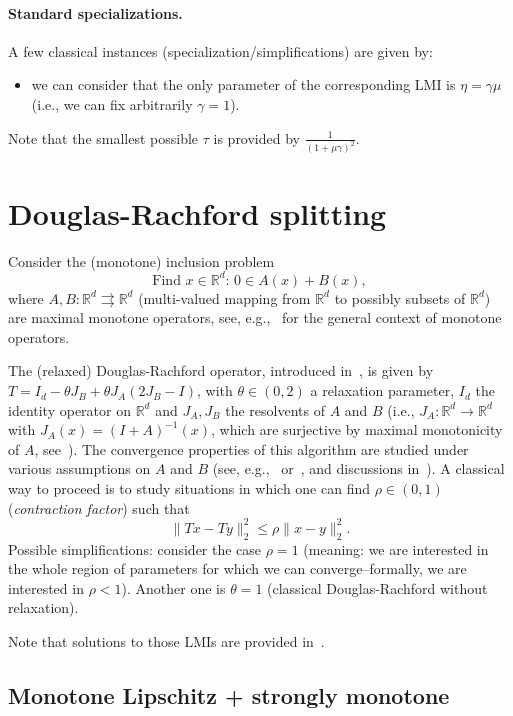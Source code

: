 \documentclass[nonacm]{acmart}
\renewcommand{\leq}{\leqslant}
\begin{document}
\paragraph{Standard specializations.} A few classical instances (specialization/simplifications) are given by:
\begin{itemize}
	\item we can consider that the only parameter of the corresponding LMI is $\eta=\gamma\mu$ (i.e., we can fix arbitrarily $\gamma=1$).
\end{itemize}
Note that the smallest possible $\tau$ is provided by $\frac{1}{(1+\mu\gamma)^2}$.
\section{Douglas-Rachford splitting}

Consider the (monotone) inclusion problem  
\[ \text{Find } {x\in\mathbb{R}^d}:\, 0\in A(x)+B(x),\]
where $A,B:\mathbb{R}^d\rightrightarrows \mathbb{R}^d$ (multi-valued mapping from $\mathbb{R}^d$ to possibly subsets of $\mathbb{R}^d$) are maximal monotone operators, see, e.g.,~\cite{bauschke2017} for the general context of monotone operators.




The (relaxed) Douglas-Rachford operator, introduced in~\cite{douglas1956numerical}, is given by $T=I_d-\theta J_B+\theta J_A(2J_B-I)$, with $\theta\in (0,2)$ a relaxation parameter, $I_d$ the identity operator on $\mathbb{R}^d$ and $J_A, J_B$ the resolvents of $A$ and $B$ (i.e., $J_A:\mathbb{R}^d\rightarrow \mathbb{R}^d$ with $J_A(x)=(I+A)^{-1}(x)$, which are surjective by maximal monotonicity of $A$, see~\cite{minty1962monotone}). The convergence properties of this algorithm are studied under various assumptions on $A$ and $B$ (see, e.g.,~\cite{giselsson2017tight} or~\cite{moursi2019douglas}, and discussions in~\cite{ryu2020operator}). A classical way to proceed is to study situations in which one can find $\rho\in(0,1)$ (\emph{contraction factor}) such that
\[ \|Tx-Ty\|_2^2\leq \rho \|x-y\|_2^2.\]
Possible simplifications: consider the case $\rho=1$ (meaning: we are interested in the whole region of parameters for which we can converge--formally, we are interested in $\rho<1$). Another one is $\theta=1$ (classical Douglas-Rachford without relaxation).

Note that solutions to those LMIs are provided in~\cite[Section 4]{ryu2020operator}.
\subsection{Monotone Lipschitz + strongly monotone}
\end{document}
